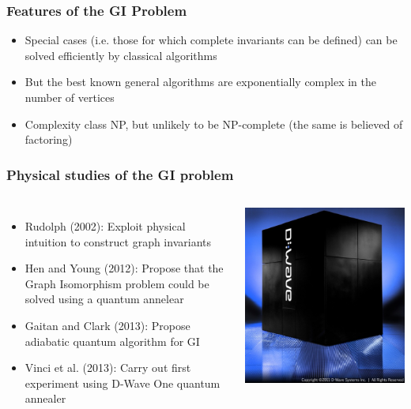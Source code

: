 \documentclass[handout]{beamer}
\begin{document}
\begin{frame}
  \frametitle{Features of the GI Problem}
  \begin{itemize}
    \item Special cases (i.e. those for which complete invariants can be
      defined) can be solved efficiently by classical algorithms
    \item But the best known general algorithms are exponentially complex in
      the number of vertices
    \item Complexity class \alert{NP}, but unlikely to be NP-complete (the same
      is believed of factoring)
  \end{itemize}
\end{frame}
\begin{frame}
  \frametitle{Physical studies of the GI problem}
    \begin{columns}
      \begin{itemize}
        \item Rudolph (2002):
          Exploit physical intuition to construct graph invariants
        \item Hen and Young (2012):
          Propose that the Graph Isomorphism problem could be solved using a
          quantum annelear
        \item Gaitan and Clark (2013):
          Propose adiabatic quantum algorithm for GI
        \item Vinci et al. (2013):
          Carry out first experiment using D-Wave One quantum annealer
      \end{itemize}
      \includegraphics{d_wave_one_system}
    \end{columns}
\end{frame}
\end{document}
